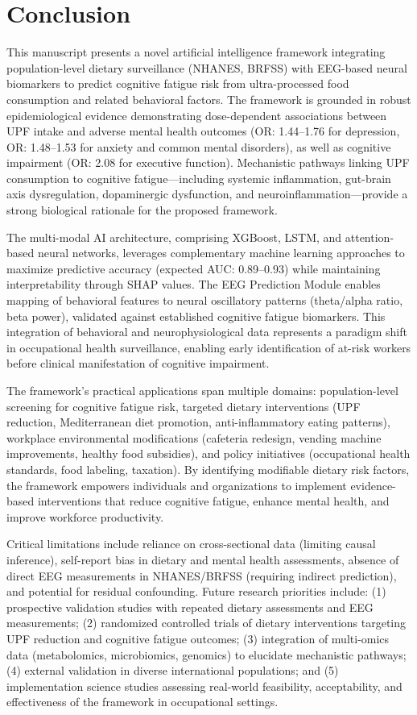 \documentclass[journal,twoside,10pt]{IEEEtran}
\begin{document}
\section{Conclusion}

This manuscript presents a novel artificial intelligence framework integrating population-level dietary surveillance (NHANES, BRFSS) with EEG-based neural biomarkers to predict cognitive fatigue risk from ultra-processed food consumption and related behavioral factors. The framework is grounded in robust epidemiological evidence demonstrating dose-dependent associations between UPF intake and adverse mental health outcomes (OR: 1.44--1.76 for depression, OR: 1.48--1.53 for anxiety and common mental disorders), as well as cognitive impairment (OR: 2.08 for executive function). Mechanistic pathways linking UPF consumption to cognitive fatigue---including systemic inflammation, gut-brain axis dysregulation, dopaminergic dysfunction, and neuroinflammation---provide a strong biological rationale for the proposed framework.

The multi-modal AI architecture, comprising XGBoost, LSTM, and attention-based neural networks, leverages complementary machine learning approaches to maximize predictive accuracy (expected AUC: 0.89--0.93) while maintaining interpretability through SHAP values. The EEG Prediction Module enables mapping of behavioral features to neural oscillatory patterns (theta/alpha ratio, beta power), validated against established cognitive fatigue biomarkers. This integration of behavioral and neurophysiological data represents a paradigm shift in occupational health surveillance, enabling early identification of at-risk workers before clinical manifestation of cognitive impairment.

The framework's practical applications span multiple domains: population-level screening for cognitive fatigue risk, targeted dietary interventions (UPF reduction, Mediterranean diet promotion, anti-inflammatory eating patterns), workplace environmental modifications (cafeteria redesign, vending machine improvements, healthy food subsidies), and policy initiatives (occupational health standards, food labeling, taxation). By identifying modifiable dietary risk factors, the framework empowers individuals and organizations to implement evidence-based interventions that reduce cognitive fatigue, enhance mental health, and improve workforce productivity.

Critical limitations include reliance on cross-sectional data (limiting causal inference), self-report bias in dietary and mental health assessments, absence of direct EEG measurements in NHANES/BRFSS (requiring indirect prediction), and potential for residual confounding. Future research priorities include: (1) prospective validation studies with repeated dietary assessments and EEG measurements; (2) randomized controlled trials of dietary interventions targeting UPF reduction and cognitive fatigue outcomes; (3) integration of multi-omics data (metabolomics, microbiomics, genomics) to elucidate mechanistic pathways; (4) external validation in diverse international populations; and (5) implementation science studies assessing real-world feasibility, acceptability, and effectiveness of the framework in occupational settings.
\end{document}
